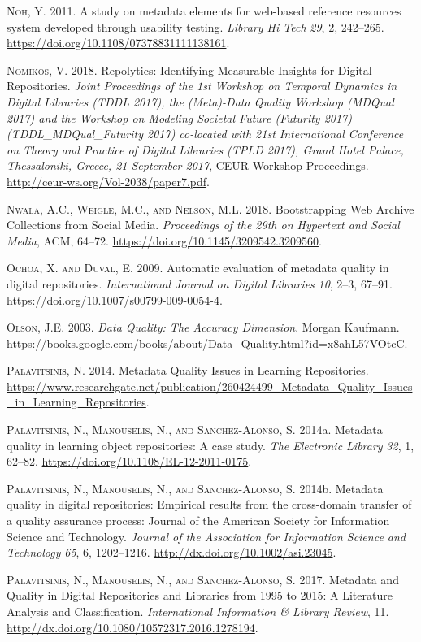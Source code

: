 \textsc{Noh, Y.} 2011. A study on metadata elements for web-based reference resources system developed through usability testing. \emph{Library Hi Tech} \emph{29}, 2, 242–265. \url{https://doi.org/10.1108/07378831111138161}.

\textsc{Nomikos, V.} 2018. Repolytics: Identifying Measurable Insights for Digital Repositories. \emph{Joint Proceedings of the 1st Workshop on Temporal Dynamics in Digital Libraries (TDDL 2017), the (Meta)-Data Quality Workshop (MDQual 2017) and the Workshop on Modeling Societal Future (Futurity 2017) (TDDL\_MDQual\_Futurity 2017) co-located with 21st International Conference on Theory and Practice of Digital Libraries (TPLD 2017), Grand Hotel Palace, Thessaloniki, Greece, 21 September 2017}, CEUR Workshop Proceedings. \url{http://ceur-ws.org/Vol-2038/paper7.pdf}.

\textsc{Nwala, A.C., Weigle, M.C., and Nelson, M.L.} 2018. Bootstrapping Web Archive Collections from Social Media. \emph{Proceedings of the 29th on Hypertext and Social Media}, ACM, 64–72. \url{https://doi.org/10.1145/3209542.3209560}.

\textsc{Ochoa, X. and Duval, E.} 2009. Automatic evaluation of metadata quality in digital repositories. \emph{International Journal on Digital Libraries} \emph{10}, 2–3, 67–91. \url{https://doi.org/10.1007/s00799-009-0054-4}.

\textsc{Olson, J.E.} 2003. \emph{Data Quality: The Accuracy Dimension}. Morgan Kaufmann. \url{https://books.google.com/books/about/Data_Quality.html?id=x8ahL57VOtcC}.

\textsc{Palavitsinis, N.} 2014. Metadata Quality Issues in Learning Repositories. \url{https://www.researchgate.net/publication/260424499_Metadata_Quality_Issues_in_Learning_Repositories}.

\textsc{Palavitsinis, N., Manouselis, N., and Sanchez-Alonso, S.} 2014a. Metadata quality in learning object repositories: A case study. \emph{The Electronic Library} \emph{32}, 1, 62–82. \url{https://doi.org/10.1108/EL-12-2011-0175}.

\textsc{Palavitsinis, N., Manouselis, N., and Sanchez-Alonso, S.} 2014b. Metadata quality in digital repositories: Empirical results from the cross-domain transfer of a quality assurance process: Journal of the American Society for Information Science and Technology. \emph{Journal of the Association for Information Science and Technology} \emph{65}, 6, 1202–1216. \url{http://dx.doi.org/10.1002/asi.23045}.

\textsc{Palavitsinis, N., Manouselis, N., and Sanchez-Alonso, S.} 2017. Metadata and Quality in Digital Repositories and Libraries from 1995 to 2015: A Literature Analysis and Classification. \emph{International Information \& Library Review}, 11. \url{http://dx.doi.org/10.1080/10572317.2016.1278194}.

